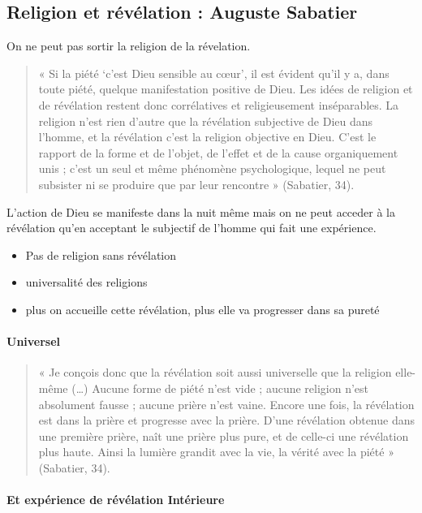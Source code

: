 \subsection{Religion et révélation : Auguste Sabatier} 


On ne peut pas sortir la religion de la révelation.

\begin{quote}
    « Si la piété ‘c’est Dieu sensible au cœur’, il est évident qu’il y a, dans toute piété, quelque manifestation positive de Dieu. Les idées de religion et de révélation restent donc corrélatives et religieusement inséparables. La religion n’est rien d’autre que la révélation subjective de Dieu dans l’homme, et la révélation c’est la religion objective en Dieu. C’est le rapport de la forme et de l’objet, de l’effet et de la cause organiquement unis ; c’est un seul et même phénomène psychologique, lequel ne peut subsister ni se produire que par leur rencontre » (Sabatier, 34). 
\end{quote}

L'action de Dieu se manifeste dans la nuit même mais on ne peut acceder à la révélation qu'en acceptant le subjectif de l'homme qui fait une expérience.

\begin{itemize}
    \item Pas de religion sans révélation
    \item universalité des religions
    \item plus on accueille cette révélation, plus elle va progresser dans sa pureté
\end{itemize}

\paragraph{Universel}
\begin{quote}
    « Je conçois donc que la révélation soit aussi universelle que la religion elle-même (…) Aucune forme de piété n’est vide ; aucune religion n’est absolument fausse ; aucune prière n’est vaine. Encore une fois, la révélation est dans la prière et progresse avec la prière. D’une révélation obtenue dans une première prière, naît une prière plus pure, et de celle-ci une révélation plus haute. Ainsi la lumière grandit avec la vie, la vérité avec la piété » (Sabatier, 34). 
\end{quote}

\paragraph{Et expérience de révélation Intérieure}


